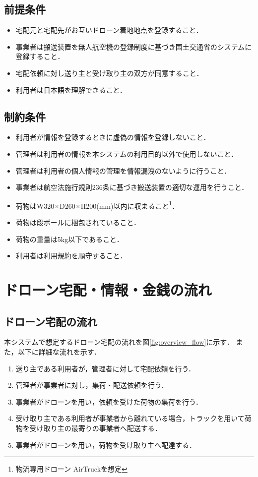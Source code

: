 \documentclass[a4paper, titlepage]{jsarticle}
\begin{document}
\subsection{前提条件}
\begin{itemize}
  \item 宅配元と宅配先がお互いドローン着地地点を登録すること．
  \item 事業者は搬送装置を無人航空機の登録制度に基づき国土交通省のシステムに登録すること．
  \item 宅配依頼に対し送り主と受け取り主の双方が同意すること．
  \item 利用者は日本語を理解できること．
\end{itemize}
\subsection{制約条件}
\begin{itemize}
\item 利用者が情報を登録するときに虚偽の情報を登録しないこと．
\item 管理者は利用者の情報を本システムの利用目的以外で使用しないこと．
\item 管理者は利用者の個人情報の管理を情報漏洩のないように行うこと．
\item 事業者は航空法施行規則236条に基づき搬送装置の適切な運用を行うこと．
\item 荷物はW320$\times$D260$\times$H200(mm)以内に収まること\footnote{\label{fot:airtruck}物流専用ドローン AirTruck\cite{aeronext_airtruck}を想定}．
\item 荷物は段ボールに梱包されていること．
\item 荷物の重量は5kg以下であること．
\item 利用者は利用規約を順守すること．
\end{itemize}
\section{ドローン宅配・情報・金銭の流れ}

\subsection{ドローン宅配の流れ}
本システムで想定するドローン宅配の流れを図\ref{fig:overview_flow}に示す．
また，以下に詳細な流れを示す．

\begin{enumerate}[label=\raise0.2ex\hbox{\textcircled{\scriptsize{\arabic*}}}]
\item 送り主である利用者が，管理者に対して宅配依頼を行う．
\item 管理者が事業者に対し，集荷・配送依頼を行う．
\item 事業者がドローンを用い，依頼を受けた荷物の集荷を行う．
\item 受け取り主である利用者が事業者から離れている場合，トラックを用いて荷物を受け取り主の最寄りの事業者へ配送する．
\item 事業者がドローンを用い，荷物を受け取り主へ配達する．
\end{enumerate}
\end{document}
